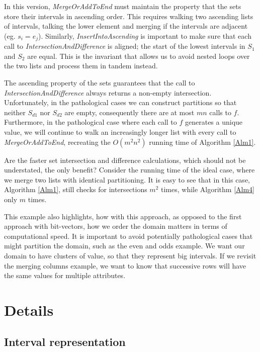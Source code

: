 \documentclass{article}
\begin{document}
In this version, \emph{MergeOrAddToEnd} must maintain the property that the
sets store their intervals in ascending order.
This requires walking two ascending lists of intervals,
talking the lower element and merging if the intervals are adjacent
(eg. $s_{i} = e_{j}$).
Similarly, \emph{InsertIntoAscending} is important to make sure that each
call to \emph{IntersectionAndDifference} is aligned;
the start of the lowest intervals in $S_{1}$ and $S_{2}$ are equal.
This is the invariant that allows us to avoid nested loops over the two lists
and process them in tandem instead.

The ascending property of the sets guarantees that the call to
\emph{IntersectionAndDifference} always returns a non-empty intersection.
Unfortunately,
in the pathological cases we can construct partitions so that
neither $S_{d1}$ nor $S_{d2}$ are empty,
consequently there are at most $mn$ calls to $f$.
Furthermore,
in the pathological case where each call to $f$ generates a unique value,
we will continue to walk an increasingly longer list with every call to
\emph{MergeOrAddToEnd},
recreating the $O(m^{2}n^{2})$ running time of Algorithm \ref{Alm1}.

Are the faster set intersection and difference calculations,
which should not be understated,
the only benefit?
Consider the running time of the ideal case,
where we merge two lists with identical partitioning.
It is easy to see that in this case,
Algorithm \ref{Alm1},
still checks for intersections $m^{2}$ times,
while Algorithm \ref{Alm4} only $m$ times.

This example also highlights,
how with this approach,
as opposed to the first approach with bit-vectors,
how we order the domain matters in terms of computational speed.
It is important to avoid potentially pathological cases that might
partition the domain, such as the even and odds example.
We want our domain to have clusters of value,
so that they represent big intervals.
If we revisit the merging columns example,
we want to know that successive rows will have the same values for
multiple attributes.

\section{Details}

\subsection{Interval representation}
\end{document}
